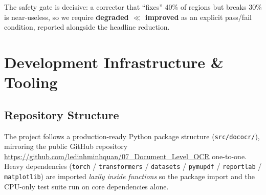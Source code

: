 \documentclass[12pt,a4paper]{article}
\begin{document}
The safety gate is decisive: a corrector that ``fixes'' 40\% of regions but breaks 30\% is near-useless, so we require \textbf{degraded $\ll$ improved} as an explicit pass/fail condition, reported alongside the headline reduction.

\section{Development Infrastructure \& Tooling}

\subsection{Repository Structure}

The project follows a production-ready Python package structure (\texttt{src/dococr/}), mirroring the public GitHub repository \url{https://github.com/ledinhminhquan/07_Document_Level_OCR} one-to-one. Heavy dependencies (\texttt{torch} / \texttt{transformers} / \texttt{datasets} / \texttt{pymupdf} / \texttt{reportlab} / \texttt{matplotlib}) are imported \emph{lazily inside functions} so the package import and the CPU-only test suite run on core dependencies alone.
\end{document}
